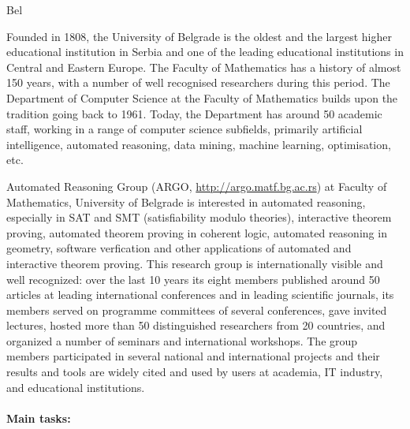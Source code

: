 \begin{sitedescription}{Bel}


  Founded in 1808, the University of Belgrade is the oldest and the
  largest higher educational institution in Serbia and one of the
  leading educational institutions in Central and Eastern Europe. The
  Faculty of Mathematics has a history of almost 150 years, with a
  number of well recognised researchers during this period. The
  Department of Computer Science at the Faculty of Mathematics builds
  upon the tradition going back to 1961. Today, the Department has
  around 50 academic staff, working in a range of computer science
  subfields, primarily artificial intelligence, automated reasoning,
  data mining, machine learning, optimisation, etc.
  
  Automated Reasoning Group (ARGO, \url{http://argo.matf.bg.ac.rs}) at
  Faculty of Mathematics, University of Belgrade is interested in
  automated reasoning, especially in SAT and SMT (satisfiability
  modulo theories), interactive theorem proving, automated theorem
  proving in coherent logic, automated reasoning in geometry, software
  verfication and other applications of automated and interactive
  theorem proving. This research group is internationally visible and
  well recognized: over the last 10 years its eight members published
  around 50 articles at leading international conferences and in
  leading scientific journals, its members served on programme
  committees of several conferences, gave invited lectures, hosted
  more than 50 distinguished researchers from 20 countries, and
  organized a number of seminars and international workshops. The
  group members participated in several national and international
  projects and their results and tools are widely cited and used by
  users at academia, IT industry, and educational institutions.

  \paragraph{Main tasks:}

  

\end{sitedescription}
